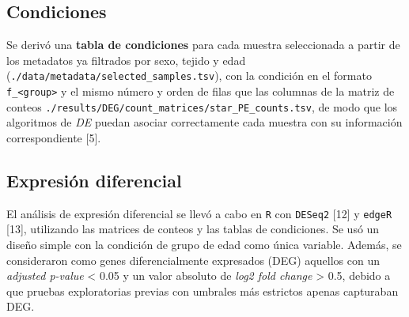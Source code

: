 \documentclass[
  12pt,
  letterpaper,
  DIV=11,
  numbers=noendperiod]{scrartcl}
\begin{document}
\subsection{Condiciones}\label{condiciones}

Se derivó una \textbf{tabla de condiciones} para cada muestra
seleccionada a partir de los metadatos ya filtrados por sexo, tejido y
edad (\texttt{./data/metadata/selected\_samples.tsv}), con la condición
en el formato \texttt{f\_\textless{}group\textgreater{}} y el mismo
número y orden de filas que las columnas de la matriz de conteos
\texttt{./results/DEG/count\_matrices/star\_PE\_counts.tsv}, de modo que
los algoritmos de \emph{DE} puedan asociar correctamente cada muestra
con su información correspondiente {[}5{]}.

\begin{table}[H]

\caption{\label{tbl-samples-order}Orden de las muestras en la tabla de
condiciones. Las muestras no se encuentran ordenadas por condición, sino
que siguen el orden alfabético de las matrices de conteos. Los
algoritmos de DE asocian cada muestra con su condición según el orden de
las filas, y este se mantiene consistente, por lo que la estrategia de
ordenado es indistinta.}


\end{table}%

\subsection{Expresión diferencial}\label{expresiuxf3n-diferencial}

El análisis de expresión diferencial se llevó a cabo en \texttt{R} con
\texttt{DESeq2} {[}12{]} y \texttt{edgeR} {[}13{]}, utilizando las
matrices de conteos y las tablas de condiciones. Se usó un diseño simple
con la condición de grupo de edad como única variable. Además, se
consideraron como genes diferencialmente expresados (DEG) aquellos con
un \emph{adjusted p-value} \textless{} 0.05 y un valor absoluto de
\emph{log2 fold change} \textgreater{} 0.5, debido a que pruebas
exploratorias previas con umbrales más estrictos apenas capturaban DEG.
\end{document}
